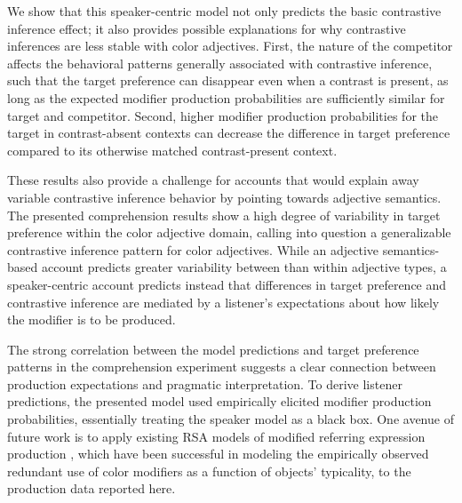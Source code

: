 \documentclass[10pt,letterpaper]{article}
\begin{document}
We show that this speaker-centric model not only predicts the basic contrastive inference effect; it also provides possible explanations for why contrastive inferences are less stable with color adjectives. First, the nature of the competitor affects the behavioral patterns generally associated with contrastive inference, such that the target preference can disappear even when a contrast is present, as long as the expected modifier production probabilities are sufficiently similar for target and competitor. Second, higher modifier production probabilities for the target in contrast-absent contexts can decrease the difference in target preference compared to its otherwise matched contrast-present context. 

These results also provide a challenge for accounts that would explain away variable contrastive inference behavior by pointing towards adjective semantics. The presented comprehension results show a high degree of variability in target preference within the color adjective domain, calling into question a generalizable contrastive inference pattern for color adjectives. 
While an adjective semantics-based account predicts greater variability between than within adjective types, a speaker-centric account predicts instead that differences in target preference and contrastive inference are mediated by a listener's expectations about how likely the modifier is to be produced. 

The strong correlation between the model predictions and target preference patterns in the comprehension experiment suggests a clear connection between production expectations and pragmatic interpretation. To derive listener predictions, the presented model used empirically elicited modifier production probabilities, essentially treating the speaker model as a black box. One avenue of future work is to apply existing RSA models of modified referring expression production \cite{Degen:2020}, which have been successful in modeling the empirically observed redundant use of color modifiers as a function of objects' typicality, to the production data reported here.
\end{document}
